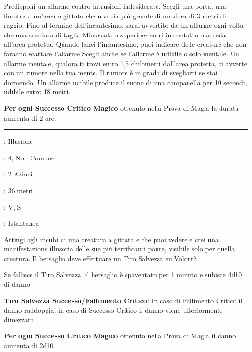 \begin{multicols}{2}
Predisponi un allarme contro intrusioni indesiderate. Scegli una porta, una finestra o un'area a gittata che non sia più grande di un sfera di 3 metri di raggio. Fino al termine dell'incantesimo, sarai avvertito da un allarme ogni volta che una creatura di taglia Minuscola o superiore entri in contatto o acceda all'area protetta. Quando lanci l'incantesimo, puoi indicare delle creature che non faranno scattare l'allarme Scegli anche se l'allarme è udibile o solo mentale. Un allarme mentale, qualora ti trovi entro 1,5 chilometri dall'area protetta, ti avverte con un rumore nella tua mente. Il rumore è in grado di svegliarti se stai dormendo. Un allarme udibile produce il suono di una campanella per 10 secondi, udibile entro 18 metri.

\textbf{Per ogni Successo Critico Magico} ottenuto nella Prova di Magia la durata aumenta di 2 ore.

\smallskip\noindent\rule{\linewidth}{2pt} \hypertarget{Allucinazione Mortale}{}\smallskip{}
\noindent
\begin{description}[noitemsep, topsep=0pt, parsep=0pt, partopsep=0pt, leftmargin=0cm, labelwidth=2.8cm]
\item[\textbf{Lista di Magia}]: Illusione
\item[\textbf{Livello}]: 4, Non Comune
\item[\textbf{T. di Lancio}]: 2 Azioni
\item[\textbf{Gittata}]: 36 metri
\item[\textbf{Componenti}]: V, S
\item[\textbf{Durata}]: Istantanea
\end{description}

Attingi agli incubi di una creatura a gittata e che puoi vedere e crei una manifestazione illusoria delle sue più terrificanti paure, visibile solo per quella creatura. Il bersaglio deve effettuare un Tiro Salvezza su Volontà.

Se fallisce il Tiro Salvezza, il bersaglio è spaventato per 1 minuto e subisce 4d10 di danno.

\textbf{Tiro Salvezza Successo/Fallimento Critico}: In caso di Fallimento Critico il danno raddoppia, in caso di Successo Critico il danno viene ulteriormente dimezzato

\textbf{Per ogni Successo Critico Magico} ottenuto nella Prova di Magia il danno aumenta di 2d10


\end{multicols}
